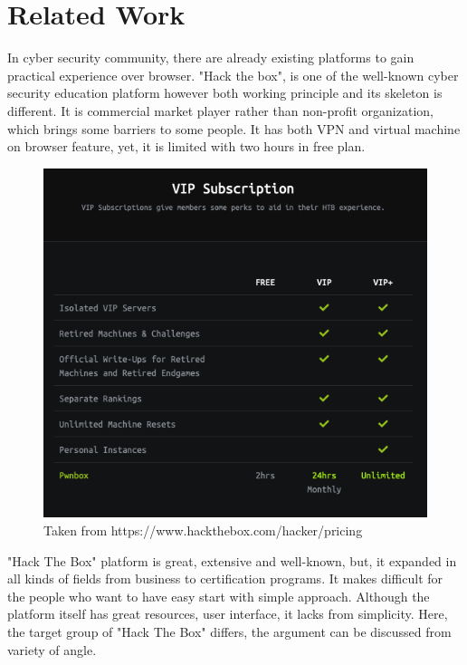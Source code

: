 \chapter{Related Work}\label{chapter:relatedwork}

In cyber security community, there are already existing platforms to gain practical experience over browser. "Hack the box", is one of the well-known cyber security education platform however both working principle and its skeleton is different. It is commercial market player rather than non-profit organization, which brings some barriers to some people. 
It has both VPN and virtual machine on browser feature, yet, it is limited with two hours in free plan.


\begin{figure}[htbp]
\centerline{\includegraphics[scale=.7]{figures/hack-the-box-pricing.png}}
\caption{Taken from https://www.hackthebox.com/hacker/pricing}
\label{fig}
\end{figure}
 

"Hack The Box" platform is great, extensive and well-known, but, it expanded in all kinds of fields from business to certification programs. It makes difficult for the people who want to have easy start with simple approach. Although the platform itself has great resources, user interface, it lacks from simplicity. Here, the target group of "Hack The Box" differs, the argument can be discussed from variety of angle.

